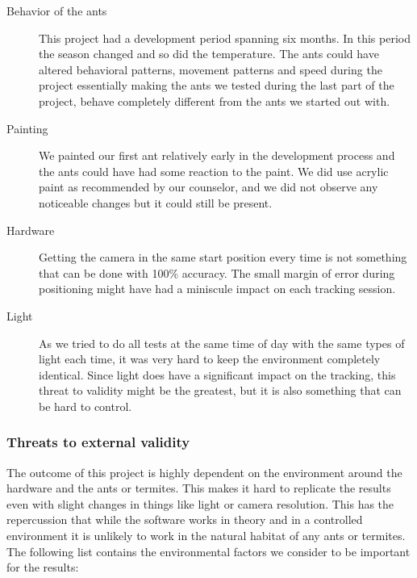 \begin{description}
\item[Behavior of the ants] This project had a development period spanning six months. In this period the season changed and so did the temperature. The ants could have altered behavioral patterns, movement patterns and speed during the project essentially making the ants we tested during the last part of the project, behave completely different from the ants we started out with. \\

\item[Painting] We painted our first ant relatively early in the development process and the ants could have had some reaction to the paint. We did use acrylic paint as recommended by our counselor, and we did not observe any noticeable changes but it could still be present. \\

\item[Hardware] Getting the camera in the same start position every time is not something that can be done with 100\% accuracy. The small margin of error during positioning might have had a miniscule impact on each tracking session. \\

\item[Light] As we tried to do all tests at the same time of day with the same types of light each time, it was very hard to keep the environment completely identical. Since light does have a significant impact on the tracking, this threat to validity might be the greatest, but it is also something that can be hard to control. \\    
\end{description}

\subsubsection{Threats to external validity} \mbox{}\par

The outcome of this project is highly dependent on the environment around the hardware and the ants or termites. This makes it hard to replicate the results even with slight changes in things like light or camera resolution. This has the repercussion that while the software works in theory and in a controlled environment it is unlikely to work in the natural habitat of any ants or termites. The following list contains the environmental factors we consider to be important for the results:

